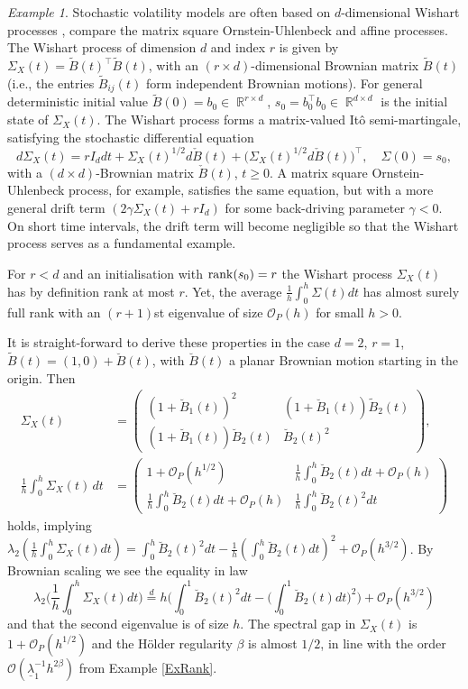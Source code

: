 \documentclass[preprint,aos]{imsart}
\numberwithin{equation}{section}
\theoremstyle{remark}
\newtheorem{example}[satz]{Example}
\DeclareMathOperator{\R}{{\mathbb R}}
\renewcommand{\ge}{\geqslant}
\begin{document}
\begin{example}\label{ExStochVol}
Stochastic volatility models are often based on $d$-dimensional Wishart processes  \citep{Bru1991}, compare the matrix square Ornstein-Uhlenbeck and affine processes. The Wishart process of dimension $d$ and index $r$ is given by $\Sigma_X(t)=\tilde B(t)^\top\tilde B(t)$, with an $(r\times d)$-dimensional  Brownian matrix $\tilde B(t)$ (i.e., the entries $\tilde B_{ij}(t)$ form independent Brownian motions). For general deterministic initial value $\tilde B(0)=b_0\in\R^{r\times d}$, $s_0=b_0^\top b_0\in\R^{d\times d}$ is the initial state of  $\Sigma_X(t)$.
The Wishart process forms a matrix-valued It\^o semi-martingale, satisfying the stochastic differential equation
\[ d\Sigma_X(t)=rI_ddt+\Sigma_X(t)^{1/2}d\check B(t)+\big(\Sigma_X(t)^{1/2}d\check B(t)\big)^\top,\quad \Sigma(0)=s_0,\]
with a $(d\times d)$-Brownian matrix $\check B(t)$, $t\ge 0$. A matrix square Ornstein-Uhlenbeck process, for example, satisfies the same equation, but with a more general drift term $(2\gamma\Sigma_X(t)+rI_d)$ for some back-driving parameter $\gamma<0$. On short time intervals, the drift term will become negligible so that  the Wishart process serves as a fundamental example.

For $r<d$ and an initialisation with $\operatorname{rank}(s_0)=r$ the Wishart process $\Sigma_X(t)$ has by definition rank at most $r$. Yet, the average $\frac1h\int_0^h\Sigma(t)dt$ has almost surely full rank with an $(r+1)$st eigenvalue of size ${\mathcal O}_P(h)$ for small $h>0$.

It is straight-forward to derive these properties in the case $d=2$, $r=1$, $\tilde B(t)=(1,0)+\breve B(t)$, with $\breve B(t)$ a planar Brownian motion starting in the origin. Then
\begin{align*}
\Sigma_X(t)&=\begin{pmatrix} (1+\breve B_1(t))^2 & (1+\breve B_1(t))\tilde B_2(t)\\ (1+\breve B_1(t))\breve B_2(t) & \breve B_2(t)^2\end{pmatrix},\\
\frac1h\int_0^h\Sigma_X(t)\,dt&=\begin{pmatrix} 1+{\mathcal O}_P(h^{1/2}) & \frac1h\int_0^h\breve B_2(t)dt+{\mathcal O}_P(h)\\ \frac1h\int_0^h\breve B_2(t)dt+{\mathcal O}_P(h) & \frac1h\int_0^h\breve B_2(t)^2dt\end{pmatrix}
\end{align*}
holds, implying $\lambda_2(\frac1h\int_0^h\Sigma_X(t)dt)=\int_0^h\breve B_2(t)^2dt-\frac1h(\int_0^h\breve B_2(t)dt)^2+{\mathcal O}_P(h^{3/2})$. By Brownian scaling we see the equality in law
\[\lambda_2\Big(\frac1h\int_0^h\Sigma_X(t)dt\Big)\stackrel{d}{=}h\Big(\int_0^1\breve B_2(t)^2dt-\Big(\int_0^1\breve B_2(t)dt\Big)^2\Big)+{\mathcal O}_P(h^{3/2})\]
and that the second eigenvalue is of size $h$. The spectral gap in $\Sigma_X(t)$ is $1+{\mathcal O}_P(h^{1/2})$ and the H\"older regularity $\beta$  is almost $1/2$, in line with the  order ${\mathcal O}(\underline\lambda_1^{-1}h^{2\beta})$ from Example \ref{ExRank}.


\end{example}
\end{document}
